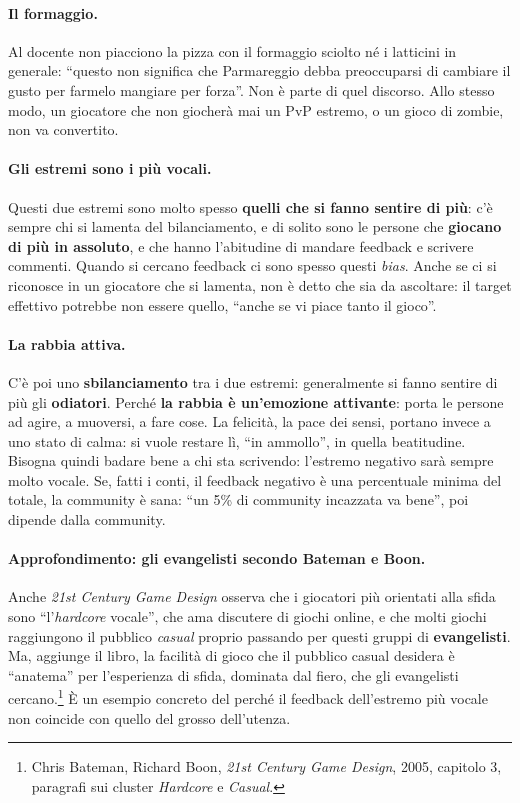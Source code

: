 \paragraph{Il formaggio.} Al docente non piacciono la pizza con il formaggio
sciolto né i latticini in generale: ``questo non significa che Parmareggio
debba preoccuparsi di cambiare il gusto per farmelo mangiare per forza''.
Non è parte di quel discorso. Allo stesso modo, un giocatore che non giocherà
mai un PvP estremo, o un gioco di zombie, non va convertito.

\paragraph{Gli estremi sono i più vocali.} Questi due estremi sono molto
spesso \textbf{quelli che si fanno sentire di più}: c'è sempre chi si lamenta
del bilanciamento, e di solito sono le persone che \textbf{giocano di più in
assoluto}, e che hanno l'abitudine di mandare feedback e scrivere commenti.
Quando si cercano feedback ci sono spesso questi \emph{bias}. Anche se ci si
riconosce in un giocatore che si lamenta, non è detto che sia da ascoltare:
il target effettivo potrebbe non essere quello, ``anche se vi piace tanto il
gioco''.

\paragraph{La rabbia attiva.} C'è poi uno \textbf{sbilanciamento} tra i due
estremi: generalmente si fanno sentire di più gli \textbf{odiatori}. Perché
\textbf{la rabbia è un'emozione attivante}: porta le persone ad agire, a
muoversi, a fare cose. La felicità, la pace dei sensi, portano invece a uno
stato di calma: si vuole restare lì, ``in ammollo'', in quella beatitudine.
Bisogna quindi badare bene a chi sta scrivendo: l'estremo negativo sarà
sempre molto vocale. Se, fatti i conti, il feedback negativo è una
percentuale minima del totale, la community è sana: ``un 5\% di community
incazzata va bene'', poi dipende dalla community.

\paragraph{Approfondimento: gli evangelisti secondo Bateman e Boon.} Anche
\emph{21st Century Game Design} osserva che i giocatori più orientati alla
sfida sono ``l'\emph{hardcore} vocale'', che ama discutere di giochi online,
e che molti giochi raggiungono il pubblico \emph{casual} proprio passando per
questi gruppi di \textbf{evangelisti}. Ma, aggiunge il libro, la facilità di
gioco che il pubblico casual desidera è ``anatema'' per l'esperienza di
sfida, dominata dal fiero, che gli evangelisti cercano.\footnote{Chris
Bateman, Richard Boon, \emph{21st Century Game Design}, 2005, capitolo 3,
paragrafi sui cluster \emph{Hardcore} e \emph{Casual}.} È un esempio
concreto del perché il feedback dell'estremo più vocale non coincide con
quello del grosso dell'utenza.

